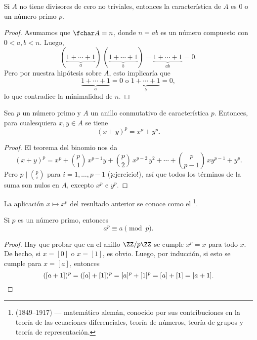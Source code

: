 \begin{observacion}
  Si $A$ no tiene divisores de cero no triviales, entonces la característica de
  $A$ es $0$ o un número primo $p$.

  \begin{proof}
    Asumamos que $\fchar A = n$, donde $n = ab$ es un número compuesto con
    $0 < a,b < n$. Luego,
    $$(\underbrace{1 + \cdots + 1}_a)\,(\underbrace{1 + \cdots + 1}_b) = \underbrace{1 + \cdots + 1}_{ab} = 0.$$
    Pero por nuestra hipótesis sobre $A$, esto implicaría que
    $$\underbrace{1 + \cdots + 1}_a = 0 \text{ o } \underbrace{1 + \cdots + 1}_b = 0,$$
    lo que contradice la minimalidad de $n$.
  \end{proof}
\end{observacion}

\begin{observacion}
  Sea $p$ un número primo y $A$ un anillo conmutativo de característica
  $p$. Entonces, para cualesquiera $x,y \in A$ se tiene
  $$(x+y)^p = x^p + y^p.$$

  \begin{proof}
    El teorema del binomio nos da
    $$(x+y)^p = x^p + {p\choose 1}\,x^{p-1} y + {p\choose 2}\,x^{p-2}\,y^2 + \cdots + {p\choose p-1}\,x y^{p-1} + y^p.$$
    Pero $p \mid {p\choose i}$ para $i = 1,\ldots,p-1$ (¡ejercicio!), así que
    todos los términos de la suma son nulos en $A$, excepto $x^p$ e $y^p$.
  \end{proof}
\end{observacion}

La aplicación $x\mapsto x^p$ del resultado anterior se conoce como el
\footnote{ (1849--1917) --- matemático alemán, conocido por sus
  contribuciones en la teoría de las ecuaciones diferenciales, teoría de
  números, teoría de grupos y teoría de representación.}.

\begin{corolario}
  \label{corr:pequeno-teorema-de-Fermat}
  Si $p$ es un número primo, entonces
  $$a^p \equiv a \pmod{p}.$$

  \begin{proof}
    Hay que probar que en el anillo $\ZZ/p\ZZ$ se cumple $x^p = x$ para todo
    $x$. De hecho, si $x = [0]$ o $x = [1]$, es obvio. Luego, por inducción, si
    esto se cumple para $x = [a]$, entonces
    \[ ([a+1])^p = ([a] + [1])^p = [a]^p + [1]^p = [a] + [1] = [a+1]. \qedhere \]
  \end{proof}
\end{corolario}

